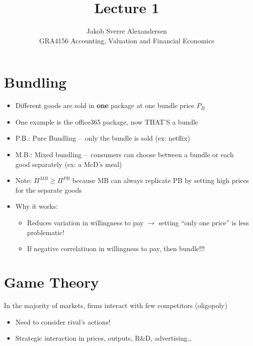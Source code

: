 \documentclass[10pt]{article}
\begin{document}
 
\title{Lecture 1}
\author{Jakob Sverre Alexandersen\\
GRA4156 Accounting, Valuation and Financial Economics}
\maketitle

\tableofcontents
\newpage

\section{Bundling}

\begin{itemize}
    \item Different goods are sold in \textbf{one} package at one bundle price $P_B$
    \item One example is the office365 package, now THAT'S a bundle 
    \item P.B.: Pure Bundling – only the bundle is sold (ex: netflix)
    \item M.B.: Mixed bundling – consumers can choose between a bundle or each good separately (ex: a McD's meal)
    \item Note: $\Pi^{MB} \geq \Pi^{PB}$ because MB can always replicate PB by setting high prices for the separate goods
    \item Why it works: 
    \begin{itemize}
        \item Reduces variation in willingness to pay $\to$ setting ``only one price'' is less problematic!
        \item If negative correlatiuon in willingness to pay, then bundle!!!
    \end{itemize}
\end{itemize}

\newpage

\section{Game Theory}

In the majority of markets, firms interact with few competitors (oligopoly)
\begin{itemize}
    \item Need to consider rival's actions!
    \item Strategic interaction in prices, outputs, R\&D, advertising…
\end{itemize}
\end{document}
